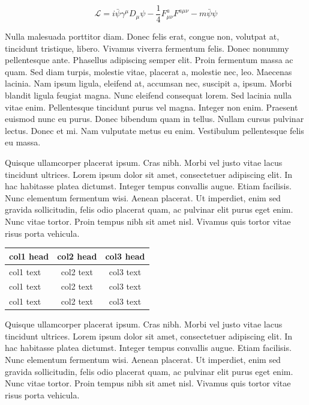 \documentclass[AMS,STIX2COL]{WileyNJD-v2}
\begin{document}
    \begin{equation}
        \mathcal{L} = i \bar{\psi} \gamma^\mu D_\mu \psi
        - \frac{1}{4} F_{\mu\nu}^a F^{a\mu\nu} - m \bar{\psi} \psi
        \label{eq26}
    \end{equation}

    Nulla malesuada porttitor diam. Donec felis erat, congue non, volutpat at, tincidunt tristique, libero. Vivamus
    viverra fermentum felis. Donec nonummy pellentesque ante. Phasellus adipiscing semper elit. Proin fermentum massa
    ac quam. Sed diam turpis, molestie vitae, placerat a, molestie nec, leo. Maecenas lacinia. Nam ipsum ligula, eleifend
    at, accumsan nec, suscipit a, ipsum. Morbi blandit ligula feugiat magna. Nunc eleifend consequat lorem. Sed lacinia
    nulla vitae enim. Pellentesque tincidunt purus vel magna. Integer non enim. Praesent euismod nunc eu purus. Donec
    bibendum quam in tellus. Nullam cursus pulvinar lectus. Donec et mi. Nam vulputate metus eu enim. Vestibulum
    pellentesque felis eu massa.

    Quisque ullamcorper placerat ipsum. Cras nibh. Morbi vel justo vitae lacus tincidunt ultrices. Lorem ipsum dolor sit
    amet, consectetuer adipiscing elit. In hac habitasse platea dictumst. Integer tempus convallis augue. Etiam facilisis.
    Nunc elementum fermentum wisi. Aenean placerat. Ut imperdiet, enim sed gravida sollicitudin, felis odio placerat
    quam, ac pulvinar elit purus eget enim. Nunc vitae tortor. Proin tempus nibh sit amet nisl. Vivamus quis tortor
    vitae risus porta vehicula.


    \begin{center}
        \begin{tabular*}{250pt}{@{\extracolsep\fill}lcc@{\extracolsep\fill}}%
            \toprule
            \textbf{col1 head} & \textbf{col2 head} & \textbf{col3 head} \\
            \midrule
            col1 text          & col2 text          & col3 text          \\
            col1 text          & col2 text          & col3 text          \\
            col1 text          & col2 text          & col3 text          \\
            \bottomrule
        \end{tabular*}
    \end{center}


    Quisque ullamcorper placerat ipsum. Cras nibh. Morbi vel justo vitae lacus tincidunt ultrices. Lorem ipsum dolor sit
    amet, consectetuer adipiscing elit. In hac habitasse platea dictumst. Integer tempus convallis augue. Etiam facilisis.
    Nunc elementum fermentum wisi. Aenean placerat. Ut imperdiet, enim sed gravida sollicitudin, felis odio placerat
    quam, ac pulvinar elit purus eget enim. Nunc vitae tortor. Proin tempus nibh sit amet nisl. Vivamus quis tortor
    vitae risus porta vehicula.
\end{document}
